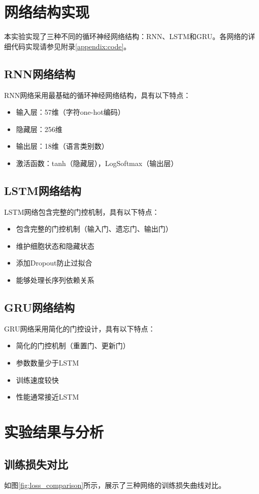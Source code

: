 \documentclass[a4paper]{article}
\begin{document}
\section{网络结构实现}
本实验实现了三种不同的循环神经网络结构：RNN、LSTM和GRU。各网络的详细代码实现请参见附录\ref{appendix:code}。

\subsection{RNN网络结构}
RNN网络采用最基础的循环神经网络结构，具有以下特点：
\begin{itemize}
    \item 输入层：57维（字符one-hot编码）
    \item 隐藏层：256维
    \item 输出层：18维（语言类别数）
    \item 激活函数：tanh（隐藏层），LogSoftmax（输出层）
\end{itemize}

\subsection{LSTM网络结构}
LSTM网络包含完整的门控机制，具有以下特点：
\begin{itemize}
    \item 包含完整的门控机制（输入门、遗忘门、输出门）
    \item 维护细胞状态和隐藏状态
    \item 添加Dropout防止过拟合
    \item 能够处理长序列依赖关系
\end{itemize}

\subsection{GRU网络结构}
GRU网络采用简化的门控设计，具有以下特点：
\begin{itemize}
    \item 简化的门控机制（重置门、更新门）
    \item 参数数量少于LSTM
    \item 训练速度较快
    \item 性能通常接近LSTM
\end{itemize}

\section{实验结果与分析}
\subsection{训练损失对比}
如图\ref{fig:loss_comparison}所示，展示了三种网络的训练损失曲线对比。
\end{document}
